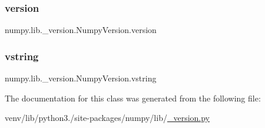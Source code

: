 \subsubsection{\texorpdfstring{version}{version}}
{\footnotesize\ttfamily numpy.\+lib.\+\_\+version.\+Numpy\+Version.\+version}

\mbox{\label{classnumpy_1_1lib_1_1__version_1_1NumpyVersion_a042f75c1c65f7a901b91cae401bb61b4}} 
\subsubsection{\texorpdfstring{vstring}{vstring}}
{\footnotesize\ttfamily numpy.\+lib.\+\_\+version.\+Numpy\+Version.\+vstring}



The documentation for this class was generated from the following file\+:\begin{DoxyCompactItemize}
\item 
venv/lib/python3./site-\/packages/numpy/lib/\hyperlink{numpy_2lib_2__version_8py}{\+\_\+version.\+py}\end{DoxyCompactItemize}

